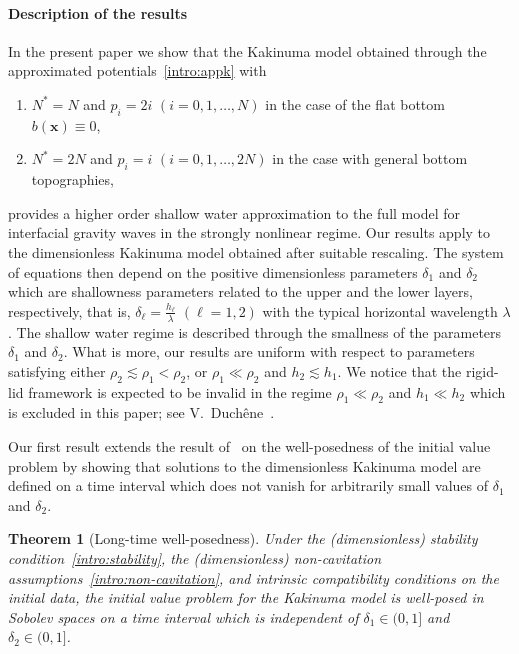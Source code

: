 \documentclass[11pt,leqno]{article}
\newtheorem{theorem}{\bf Theorem}[section]
\numberwithin{equation}{section}
\numberwithin{figure}{section}
\begin{document}
\paragraph{Description of the results}

In the present paper we show that the Kakinuma model obtained through the 
approximated potentials~\eqref{intro:appk} with 
%
\begin{enumerate}
\item[(H1)]
$N^*=N$ and $p_i=2i$ $(i=0,1,\ldots,N)$ in the case of the flat bottom $b(\bm{x})\equiv0$, 
%
\item[(H2)]
$N^*=2N$ and $p_i=i$ $(i=0,1,\ldots,2N)$ in the case with general bottom topographies, 
\end{enumerate}
%
provides a higher order shallow water approximation to the full model for interfacial gravity waves in the strongly nonlinear regime. 
Our results apply to the dimensionless Kakinuma model obtained after suitable rescaling. The system of equations then depend on the 
positive dimensionless parameters  $\delta_1$ and $\delta_2$ which are shallowness parameters related to 
the upper and the lower layers, respectively, that is, $\delta_\ell=\frac{h_\ell}{\lambda}$ $(\ell=1,2)$ 
with the typical horizontal wavelength $\lambda$. The shallow water regime is described through the smallness of the parameters $\delta_1$ and $\delta_2$.
What is more, our results are uniform with respect to parameters satisfying either $\rho_2\lesssim \rho_1<\rho_2$, or $\rho_1\ll\rho_2$ and $h_2\lesssim h_1$.
We notice that the rigid-lid framework is expected to be invalid in the regime $\rho_1\ll\rho_2$ and $h_1\ll h_2$ which is excluded in this paper; see V.~Duchêne~\cite{Duchene12}.


Our first result extends the result of~\cite{DucheneIguchi2020} on the well-posedness of the initial value problem
by showing that solutions to the dimensionless Kakinuma model
are defined on a time interval which does not vanish for arbitrarily small values of $\delta_1$ and $\delta_2$. 


\begin{theorem}[Long-time well-posedness]\label{T.uniform}
	Under the (dimensionless) stability condition~\eqref{intro:stability}, 
	the (dimensionless) non-cavitation assumptions~\eqref{intro:non-cavitation}, and intrinsic compatibility conditions on the initial data, 
	the initial value problem for the Kakinuma model is well-posed in Sobolev spaces on a time interval which is 
	independent of $\delta_1\in(0,1]$ and $\delta_2\in(0,1]$. 
\end{theorem}
\end{document}
